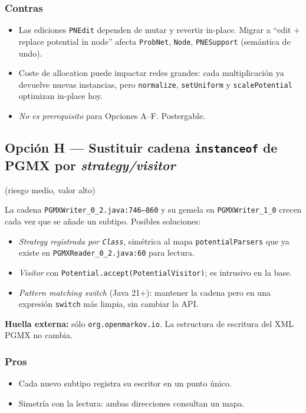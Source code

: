 \documentclass[11pt,a4paper]{article}
\newcommand{\code}[1]{\texttt{#1}}
\begin{document}
\subsubsection*{Contras}
\begin{itemize}[leftmargin=*]
  \item Las ediciones \code{PNEdit} dependen de mutar y revertir
        in-place. Migrar a ``edit + replace potential in node'' afecta
        \code{ProbNet}, \code{Node}, \code{PNESupport} (semántica de undo).
  \item Coste de allocation puede impactar redes grandes: cada multiplicación
        ya devuelve nuevas instancias, pero \code{normalize}, \code{setUniform}
        y \code{scalePotential} optimizan in-place hoy.
  \item \emph{No es prerequisito} para Opciones A--F. Postergable.
\end{itemize}

\subsection{Opción H --- Sustituir cadena \code{instanceof} de PGMX por
\emph{strategy/visitor}} (riesgo medio, valor alto)

La cadena \code{PGMXWriter\_0\_2.java:746--860} y su gemela en
\code{PGMXWriter\_1\_0} crecen cada vez que se añade un subtipo. Posibles
soluciones:

\begin{itemize}[leftmargin=*]
  \item \emph{Strategy registrada por \code{Class}}, simétrica al mapa
        \code{potentialParsers} que ya existe en
        \code{PGMXReader\_0\_2.java:60} para lectura.
  \item \emph{Visitor} con \code{Potential.accept(PotentialVisitor)}; es
        intrusivo en la base.
  \item \emph{Pattern matching switch} (Java 21+): mantener la cadena pero
        en una expresión \code{switch} más limpia, sin cambiar la API.
\end{itemize}

\textbf{Huella externa:} sólo \code{org.openmarkov.io}. La estructura de
escritura del XML PGMX no cambia.

\subsubsection*{Pros}
\begin{itemize}[leftmargin=*]
  \item Cada nuevo subtipo registra su escritor en un punto único.
  \item Simetría con la lectura: ambas direcciones consultan un mapa.
\end{itemize}
\end{document}
